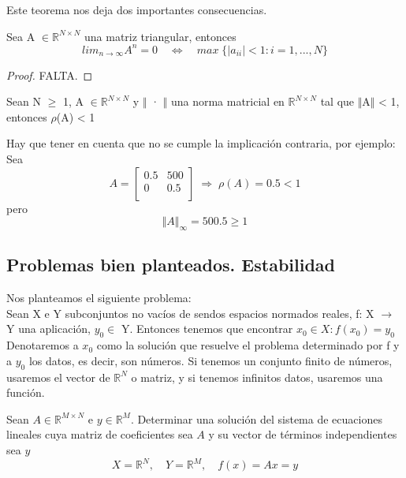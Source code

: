 Este teorema nos deja dos importantes consecuencias.

\begin{ncor}
Sea A $\in \mathbb{R}^{N \times N}$ una matriz triangular, entonces
\[ lim_{n \rightarrow \infty} A^n = 0 \quad \Leftrightarrow \quad max \; \lbrace \vert a_{ii} \vert < 1 : i = 1,...,N \rbrace \]
\end{ncor}

\begin{proof}
FALTA.
\end{proof}

\begin{ncor}
Sean N $\geq$ 1, A $\in \mathbb{R}^{N \times N}$ y $\Vert$ · $\Vert$ una norma matricial en $\mathbb{R}^{N \times N}$ tal que $\Vert$A$\Vert$ < 1, entonces $\rho$(A) < 1
\end{ncor}

Hay que tener en cuenta que no se cumple la implicación contraria, por ejemplo:\\
Sea $$A = \begin{bmatrix}
0.5 & 500 \\
0 & 0.5 \\
\end{bmatrix} \; \Rightarrow \; \rho (A) = 0.5 < 1$$
pero $$\Vert A \Vert _\infty = 500.5 \geq 1$$


\subsection{Problemas bien planteados. Estabilidad}
Nos planteamos el siguiente problema:\\
Sean X e Y subconjuntos no vacíos de sendos espacios normados reales, f: X $\rightarrow$ Y una aplicación, $y_0 \in$ Y. Entonces tenemos que encontrar $x_0 \in X : f(x_0) = y_0$\\
Denotaremos a $x_0$ como la solución que resuelve el problema determinado por f y a $y_0$ los datos, es decir, son números. Si tenemos un conjunto finito de números, usaremos el vector de $\mathbb{R}^N$ o matriz, y si tenemos infinitos datos, usaremos una función.

\begin{ejemplo}
Sean $A \in \mathbb{R}^{M \times N}$ e $y \in \mathbb{R}^M$. Determinar una solución del sistema de ecuaciones lineales cuya matriz de coeficientes sea $A$ y su vector de términos independientes sea $y$
$$X = \mathbb{R}^N, \quad Y = \mathbb{R}^M, \quad f(x) = Ax = y$$
\end{ejemplo}

